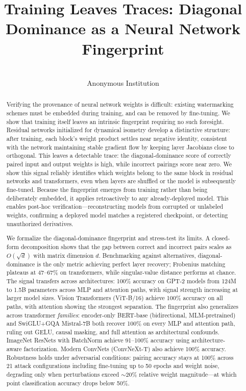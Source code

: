 \documentclass[wcp]{jmlr}
\title[Training Leaves Traces]{Training Leaves Traces: Diagonal Dominance as a Neural Network Fingerprint}
\author{\Name{Anonymous Authors}\\
\addr Anonymous Institution}
\begin{document}
\makeatletter
\let \@jmlrpages \@empty
\makeatother

\maketitle

\begin{abstract}
Verifying the provenance of neural network weights is difficult: existing watermarking schemes must be embedded during training, and can be removed by fine-tuning. We show that training itself leaves an intrinsic fingerprint requiring no such foresight. Residual networks initialized for dynamical isometry \citep{pennington2017isometry} develop a distinctive structure: after training, each block's weight product settles near negative identity, consistent with the network maintaining stable gradient flow by keeping layer Jacobians close to orthogonal. This leaves a detectable trace: the diagonal-dominance score \citep{park2026} of correctly paired input and output weights is high, while incorrect pairings score near zero. We show this signal reliably identifies which weights belong to the same block in residual networks and transformers, even when layers are shuffled or the model is subsequently fine-tuned. Because the fingerprint emerges from training rather than being deliberately embedded, it applies retroactively to any already-deployed model. This enables post-hoc verification---reconstructing models from corrupted or unlabeled weights, confirming a deployed model matches a registered checkpoint, or detecting unauthorized derivatives.

We formalize the diagonal-dominance fingerprint and stress-test its limits. A closed-form decomposition shows that the gap between correct and incorrect pairs scales as $O(\sqrt{d})$ with matrix dimension $d$. Benchmarking against alternatives, diagonal-dominance is the only metric achieving perfect layer recovery; Frobenius matching plateaus at 47--67\% on transformers, while singular-value distance performs at chance. The signal transfers across architectures: 100\% accuracy on GPT-2 models from 124M to 1.5B parameters across MLP and attention paths, with signal strength increasing at larger model sizes. Vision Transformers (ViT-B/16) achieve 100\% accuracy on all paths, with attention showing the strongest separation. The fingerprint also generalizes across transformer \emph{families}: encoder-only BERT-base (bidirectional, MLM-pretrained) and SwiGLU+GQA Mistral-7B both recover 100\% on every MLP and attention path, ruling out GELU, causal masking, and full attention as architectural confounds. ImageNet ResNets with BatchNorm achieve 91--100\% accuracy using architecture-aware factorization. Modern ConvNets (ConvNeXt-T) also achieve 100\% accuracy. Robustness holds under adversarial conditions: pairing accuracy stays at 100\% across 21 attack configurations including fine-tuning up to 50 epochs and weight noise, degrading only when perturbations exceed ${\sim}20\%$ relative weight magnitude---at which point classification accuracy drops below 50\%.
\end{abstract}
\end{document}
